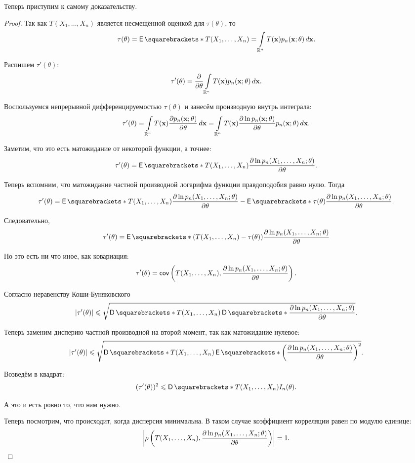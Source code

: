 Теперь приступим к самому доказательству.

\begin{proof}
	Так как \(T(X_{1}, \dots, X_{n})\) является несмещённой оценкой для 
	\(\tau(\theta)\), то
	\[
		\tau(\theta) = \E{T(X_{1}, \dots, X_{n})} = \int\limits_{\R^{n}} 
		T(\mathbf{x})p_{n}(\mathbf{x}; \theta) \diff \mathbf{x}.
	\]
	
	Распишем \(\tau'(\theta)\):
	\begin{align*}
		\tau'(\theta) = \frac{\partial}{\partial 
		\theta}\int\limits_{\mathbb{R}^{n}} T(\mathbf{x})p_{n}(\mathbf{x}; \theta) 
		\mathop{}\!d \mathbf{x}.
	\end{align*}
	
	Воспользуемся непрерывной дифференцируемостью \(\tau(\theta)\) и занесём 
	производную внутрь интеграла:
	\[
		\tau'(\theta) = \int\limits_{\mathbb{R}^{n}} T(\mathbf{x}) \frac{\partial 
		p_{n}(\mathbf{x}; \theta)}{\partial \theta} \mathop{}\!d \mathbf{x} = 
		\int\limits_{\mathbb{R}^{n}} T(\mathbf{x}) \frac{\partial\ln p_n(\mathbf{x}; \theta)}{\partial \theta} p_{n}(\mathbf{x}; 
		\theta) \mathop{}\!d \mathbf{x}.
	\]
	
	Заметим, что это есть матожидание от некоторой функции, а точнее:
	\[
		\tau'(\theta) = \E{T(X_{1}, \dots, X_{n}) \dlnpn{X_{1}, \dots, X_{n}}}.
	\]
	
	Теперь вспомним, что матожидание частной производной логарифма функции 
	правдоподобия равно нулю. Тогда
	\[
		\tau'(\theta) = \E{T(X_{1}, \dots, X_{n}) \dlnpn{X_{1}, \dots, X_{n}}} 
		- \E{\tau(\theta) \dlnpn{X_{1}, \dots, X_{n}}}.
	\]
	
	Следовательно,
	\[
		\tau'(\theta) = \E{(T(X_{1}, \dots, X_{n}) - \tau(\theta))\dlnpn{X_{1}, 
		\dots, X_{n}}}
	\]
	
	Но это есть ни что иное, как ковариация:
	\[
		\tau'(\theta) = \operatorname{\mathsf{cov}}\left(T(X_{1}, \dots, X_{n}), \frac{\partial\ln p_n(X_{1}, \dots, 
		X_{n}; \theta)}{\partial \theta}\right).
	\]
	
	Согласно неравенству Коши-Буняковского
	\[
		|\tau'(\theta)| \leq \sqrt{\D{T(X_{1}, \dots, X_{n})}\D{\dlnpn{X_{1}, 
		\dots, X_{n}}}}.
	\]
	
	Теперь заменим дисперию частной производной на второй момент, так как 
	матожидание нулевое:
	\[
		|\tau'(\theta)| \leq \sqrt{\D{T(X_{1}, \dots, 
		X_{n})}\E{\left(\dlnpn{X_{1}, \dots, X_{n}}\right)^{2}}}.
	\]
	
	Возведём в квадрат:
	\[
		(\tau'(\theta))^{2} \leq \D{T(X_{1}, \dots, X_{n})}I_{n}(\theta).
	\]
	
	А это и есть ровно то, что нам нужно.
	
	Теперь посмотрим, что происходит, когда дисперсия минимальна. В таком 
	случае коэффициент корреляции равен по модулю единице:
	\[
		\left|\rho\left(T(X_{1}, \dots, X_{n}), \frac{\partial\ln p_n(X_{1}, \dots, 
		X_{n}; \theta)}{\partial \theta}\right)\right| = 1.
	\]
	

\end{proof}
